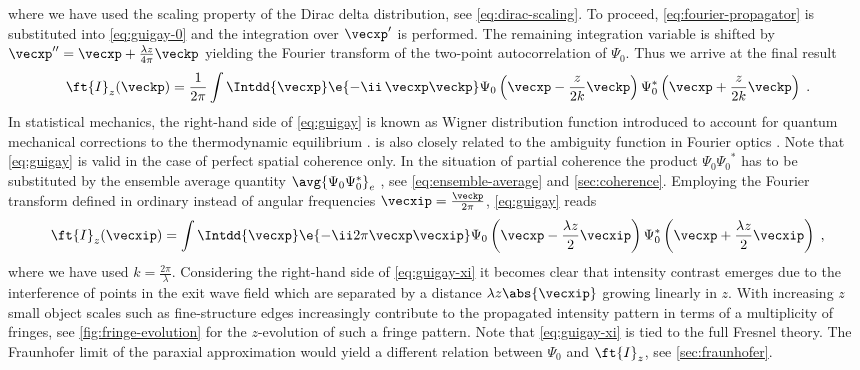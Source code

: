 \documentclass[
twoside,
openright,
titlepage,
numbers=noenddot,
headinclude,
fleqn,
a4paper,
footinclude=true,
cleardoublepage=empty,
abstractoff,
BCOR=5mm,
paper=a4,
fontsize=11pt,
british,ngerman,american,
]{scrreprt}
\begin{document}
where we have used the scaling property of the Dirac delta
distribution, see \cref{eq:dirac-scaling}.  To proceed,
\cref{eq:fourier-propagator} is substituted into \cref{eq:guigay-0}
and the integration over $\vecxp'$ is performed.  The remaining
integration variable is shifted by $\vecxp''=\vecxp+\frac{\lambda
  z}{4\pi}\veckp$ yielding the Fourier transform of the two-point
autocorrelation of $\Psi_0$.  Thus we arrive at the final result
\begin{equation}
  \label{eq:guigay}
      \ft{I}_z(\veckp) = 
      \frac{1}{2\pi}\int \Intdd{\vecxp}\e{-\ii\,\vecxp\veckp} 
      \Psi_0\left(\vecxp-\frac{z}{2k}\veckp\right)
      \Psi^*_0\left(\vecxp+\frac{z}{2k}\veckp\right) \;.
\end{equation}
In statistical mechanics, the right-hand side of \cref{eq:guigay} is
known as Wigner distribution function introduced to account for
quantum mechanical corrections to the thermodynamic equilibrium
\cite{Wigner1932}.   is also closely related to the
ambiguity function in Fourier optics \cite{Papoulis1974,Guigay1978}.
Note that \cref{eq:guigay} is valid in the case of perfect spatial
coherence only.  In the situation of partial coherence the product
$\Psi_0{\Psi_0}^*$ has to be substituted by the ensemble average
quantity $\avg{\Psi_0\Psi^*_0}_e$ , see \cref{eq:ensemble-average} and
\cref{sec:coherence}.  Employing the Fourier transform defined in
ordinary instead of angular frequencies $\vecxip
=\frac{\veckp}{2\pi}$, \cref{eq:guigay} reads
\begin{equation}
  \label{eq:guigay-xi}
    \ft{I}_z(\vecxip) = 
    \int \Intdd{\vecxp}\e{-\ii 2\pi\vecxp\vecxip} 
    \Psi_0\left(\vecxp-\frac{\lambda z}{2}\vecxip\right) 
    \Psi^*_0\left(\vecxp+\frac{\lambda z}{2}\vecxip\right) \;,
\end{equation}
where we have used $k=\frac{2\pi}{\lambda}$.  Considering the
right-hand side of \cref{eq:guigay-xi} it becomes clear that intensity
contrast emerges due to the interference of points in the exit wave
field which are separated by a distance $\lambda z\abs{\vecxip}$
growing linearly in $z$.  With increasing $z$ small object scales such
as fine-structure edges increasingly contribute to the propagated
intensity pattern in terms of a multiplicity of fringes, see
\cref{fig:fringe-evolution} for the $z$-evolution of such a fringe
pattern.  Note that \cref{eq:guigay-xi} is tied to the full Fresnel
theory.  The Fraunhofer limit of the paraxial approximation would
yield a different relation between $\Psi_0$ and $\ft{I}_z$, see
\cref{sec:fraunhofer}.
\end{document}
